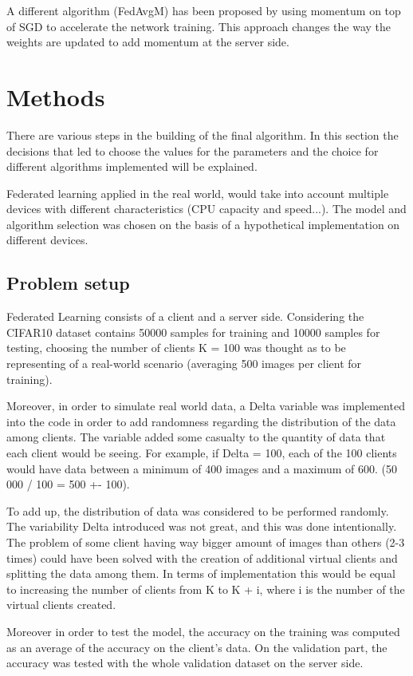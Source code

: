\documentclass[twocolumn]{article}
\begin{document}
A different algorithm (FedAvgM) has been proposed by \cite{DBLP:journals/corr/abs-1909-06335} using momentum on top of SGD to accelerate the network training. This approach changes the way the weights are updated to add momentum at the server side.

\section{Methods} %
There are various steps in the building of the final algorithm. In this section the decisions that led to choose the values for the parameters and the choice for different algorithms implemented will be explained. 

Federated learning applied in the real world, would take into account multiple devices with different characteristics (CPU capacity and speed...). The model and algorithm selection was chosen on the basis of a hypothetical implementation on different devices.  

\subsection{Problem setup}
Federated Learning consists of a client and a server side. Considering the CIFAR10 dataset contains 50000 samples for training and 10000 samples for testing, choosing the number of clients K = 100 was thought as to be representing of a real-world scenario (averaging 500 images per client for training). 

Moreover, in order to simulate real world data, a Delta variable was implemented into the code in order to add randomness regarding the distribution of the data among clients. The variable added some casualty to the quantity of data that each client would be seeing. For example, if Delta = 100, each of the 100 clients would have data between a minimum of 400 images and a maximum of 600. (50 000 / 100 = 500 +- 100).


To add up, the distribution of data was considered to be performed randomly. The variability Delta introduced was not great, and this was done intentionally. The problem of some client having way bigger amount of images than others (2-3 times) could have been solved with the creation of additional virtual clients and splitting the data among them. In terms of implementation this would be equal to increasing the number of clients from K to K + i, where i is the number of the virtual clients created. 

Moreover in order to test the model, the accuracy on the training was computed as an average of the accuracy on the client's data. On the validation part, the accuracy was tested with the whole validation dataset on the server side.
\end{document}
